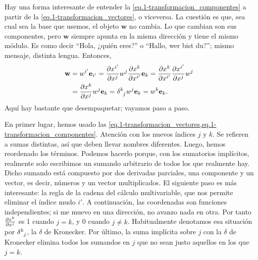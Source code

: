 \begin{observation}
    Hay una forma interesante de entender la \cref{eq.1-transformacion_componentes} a partir de la \cref{eq.1-transformacion_vectores}, o viceversa. La cuestión es que, sea cual sea la base que usemos, el objeto \(\mathbf{w}\) no cambia. Lo que cambian son sus componentes, pero \(\mathbf{w}\) siempre apunta en la misma dirección y tiene el mismo módulo. Es como decir ``Hola, ¿quién eres?'' o ``Hallo, wer bist du?''; mismo mensaje, distinta lengua. Entonces, 
    \begin{align}
        \nonumber
        \mathbf{w} &= w^{i'}\mathbf{e}_{i'} = 
        \jcbn{x}{i'}{x}{j} w^j 
        \jcbn{x}{k}{x}{i'} \mathbf{e}_k 
        = \jcbn{x}{k}{x}{i'} \jcbn{x}{i'}{x}{j} w^j \\
        \label{eq.1-vectores_invariantes}
        &= \jcbn{x}{k}{x}{j} w^j \mathbf{e}_k 
        = {\tensor{\delta}{^k_j}} w^j \mathbf{e}_k = w^k \mathbf{e}_k.
    \end{align}
    Aquí hay bastante que desempaquetar; vayamos paso a paso. 
    
    En primer lugar, hemos usado las \cref{eq.1-transformacion_vectores,eq.1-transformacion_componentes}. Atención con los nuevos índices \(j\) y \(k\). Se refieren a sumas distintas, así que deben llevar nombres diferentes. Luego, hemos reordenado los términos. Podemos hacerlo porque, con los sumatorios implícitos, realmente solo escribimos un sumando arbitrario de todos los que realmente hay. Dicho sumando está compuesto por dos derivadas parciales, una componente y un vector, es decir, números y un vector multiplicados. El siguiente paso es más interesante: la regla de la cadena del cálculo multivariable, que nos permite eliminar el índice mudo \(i'\). A continuación, las coordenadas son funciones independientes; si me muevo en una dirección, no avanzo nada en otra. Por tanto \(\frac{\partial x^{k}}{\partial x^{j}}\) es 1 cuando \(j=k\), y 0 cuando \(j\neq k\). Habitualmente denotamos esa situación por \(\tensor{\delta}{^k_j}\), la \(\delta\) de Kronecker. Por último, la suma implícita sobre \(j\) con la \(\delta\) de Kronecker elimina todos los sumandos en \(j\) que no sean justo aquellos en los que \(j=k\).
\end{observation}

